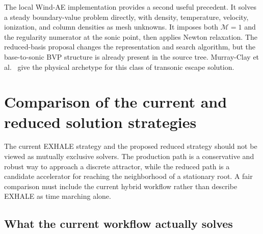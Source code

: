 \documentclass[english,a4paper]{my_memo}
\newcommand{\Mach}{\mathcal{M}}
\begin{document}
The local Wind-AE implementation provides a second useful precedent.  It solves
a steady boundary-value problem directly, with density, temperature, velocity,
ionization, and column densities as mesh unknowns.  It imposes both
\(\Mach=1\) and the regularity numerator at the sonic point, then applies Newton
relaxation.  The reduced-basis proposal changes the representation and search
algorithm, but the base-to-sonic BVP structure is already present in the source
tree.  Murray-Clay et al.~\cite{MurrayClay2009} give the physical archetype for
this class of transonic escape solution.

\section{Comparison of the current and reduced solution strategies}
\label{sec:comparison}

The current EXHALE strategy and the proposed reduced strategy should not be
viewed as mutually exclusive solvers.  The production path is a conservative
and robust way to approach a discrete attractor, while the reduced path is a
candidate accelerator for reaching the neighborhood of a stationary root.  A
fair comparison must include the current hybrid workflow rather than describe
EXHALE as time marching alone.

\subsection{What the current workflow actually solves}
\end{document}
